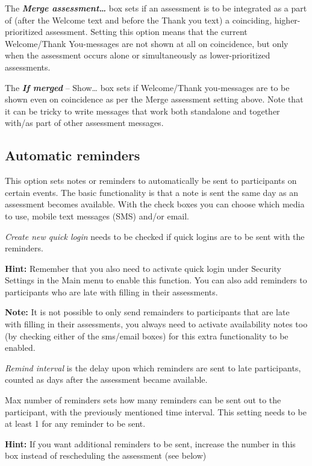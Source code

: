\documentclass[]{book}
\begin{document}
The \textbf{\emph{Merge assessment\ldots{}}} box sets if an assessment is to be integrated as a part of (after the Welcome text and before the Thank you text) a coinciding, higher-prioritized assessment. Setting this option means that the current Welcome/Thank You-messages are not shown at all on coincidence, but only when the assessment occurs alone or simultaneously as lower-prioritized assessments.

The \textbf{\emph{If merged}} -- Show\ldots{} box sets if Welcome/Thank you-messages are to be shown even on coincidence as per the Merge assessment setting above. Note that it can be tricky to write messages that work both standalone and together with/as part of other assessment messages.

\hypertarget{automatic-reminders}{%
\subsection{Automatic reminders}\label{automatic-reminders}}

This option sets notes or reminders to automatically be sent to participants on certain events. The basic functionality is that a note is sent the same day as an assessment becomes available. With the check boxes you can choose which media to use, mobile text messages (SMS) and/or email.

\emph{Create new quick login} needs to be checked if quick logins are to be sent with the reminders.

\textbf{Hint:} Remember that you also need to activate quick login under Security Settings in the Main menu to enable this function.
You can also add reminders to participants who are late with filling in their assessments.

\textbf{Note:} It is not possible to only send remainders to participants that are late with filling in their assessments, you always need to activate availability notes too (by checking either of the sms/email boxes) for this extra functionality to be enabled.

\emph{Remind interval} is the delay upon which reminders are sent to late participants, counted as days after the assessment became available.

Max number of reminders sets how many reminders can be sent out to the participant, with the previously mentioned time interval. This setting needs to be at least 1 for any reminder to be sent.

\textbf{Hint:} If you want additional reminders to be sent, increase the number in this box instead of rescheduling the assessment (see below)
\end{document}
